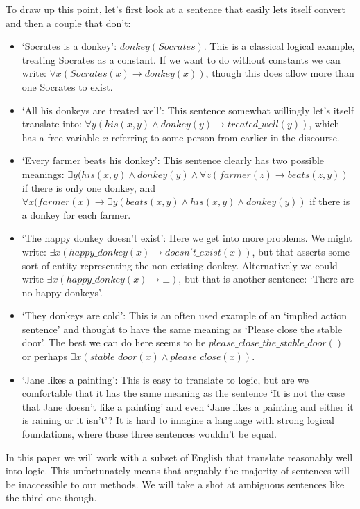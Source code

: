 \documentclass[12pt]{article}
\begin{document}
To draw up this point, let's first look at a sentence that easily lets itself convert and then a couple that don't:
\begin{itemize}
\item `Socrates is a donkey': $donkey(Socrates)$. This is a classical logical example, treating Socrates as a constant. If we want to do without constants we can write: $\forall x(Socrates(x)\rightarrow donkey(x))$, though this does allow more than one Socrates to exist.
\item `All his donkeys are treated well': This sentence somewhat willingly let's itself translate into: $\forall y(his(x,y)\wedge donkey(y) \rightarrow treated\_well(y))$, which has a free variable $x$ referring to some person from earlier in the discourse.
\item `Every farmer beats his donkey': This sentence clearly has two possible meanings: $\exists y(his(x,y)\wedge donkey(y)\wedge \forall z(farmer(z) \rightarrow beats(z,y))$ if there is only one donkey, and $\forall x(farmer(x)\rightarrow \exists y (beats(x,y)\wedge his(x,y)\wedge donkey(y))$ if there is a donkey for each farmer.
\item `The happy donkey doesn't exist': Here we get into more problems. We might write: $\exists x(happy\_donkey(x)\rightarrow doesn't\_exist(x))$, but that asserts some sort of entity representing the non existing donkey. Alternatively we could write $\exists x(happy\_donkey(x)\rightarrow \bot)$, but that is another sentence: `There are no happy donkeys'.
\item `They donkeys are cold': This is an often used example of an `implied action sentence' and thought to have the same meaning as `Please close the stable door'. The best we can do here seems to be $please\_close\_the\_stable\_door()$ or perhaps $\exists x(stable\_door(x)\wedge please\_close(x))$.
\item `Jane likes a painting': This is easy to translate to logic, but are we comfortable that it has the same meaning as the sentence `It is not the case that Jane doesn't like a painting' and even `Jane likes a painting and either it is raining or it isn't'? It is hard to imagine a language with strong logical foundations, where those three sentences wouldn't be equal.
\end{itemize}

In this paper we will work with a subset of English that translate reasonably well into logic. This unfortunately means that arguably the majority of sentences will be inaccessible to our methods. We will take a shot at ambiguous sentences like the third one though.
\end{document}
